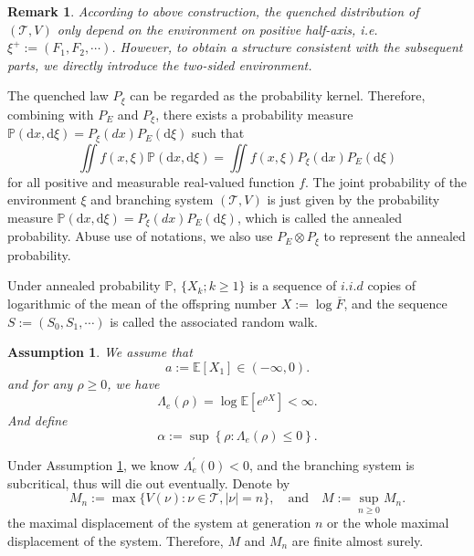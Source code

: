\documentclass[]{article}
\numberwithin{equation}{section}
\theoremstyle{thmstyleone}%
\theoremstyle{thmstyletwo}%
\newtheorem{remark}{Remark}%
\theoremstyle{thmstylethree}%
\theoremstyle{thmstylefour}%
\theoremstyle{thmstylefive}%
\newtheorem{assumption}{Assumption}
\theoremstyle{thmstylesix}%
\renewcommand{\d}{\mathrm{d}}
\newcommand{\E}{\mathbb{E}}
\newcommand{\T}{\mathcal{T}}
\renewcommand{\P}{\mathbb{P}}
\begin{document}
	\begin{remark}
		According to above construction, the quenched distribution of $\left(\T,V\right)$ only depend on the environment on positive half-axis, i.e. $\xi^+ :=\left(F_1,F_2,\cdots\right)$. However, to obtain a structure consistent with the subsequent parts, we directly introduce the two-sided environment.
	\end{remark}
	
	The quenched law $P_\xi$ can be regarded as the probability kernel. Therefore, combining with $P_E$ and $P_\xi$, 
	there exists a probability measure $\P(\d x, \d \xi)=P_\xi(dx) P_E(\d \xi)$ such that
	\begin{equation}\label{annealed prob}
	\iint f(x,\xi) \P(\d x, \d \xi) = \iint f(x,\xi) P_\xi(\d x)P_E(\d \xi)
	\end{equation}
	for all positive and measurable real-valued function $f$.
	The joint probability of the environment $\xi$ and branching system $(\mathcal{T},V)$ is just given by the probability measure $ \P(\d x, \d \xi)=P_\xi(dx) P_E(\d \xi)$, which is called the annealed probability. Abuse use of notations, we also use $P_E\otimes P_\xi$ to represent the annealed probability.
	
	
	Under annealed probability $\P$, $\{X_k;k\geqslant1\}$ is 
	a sequence of $i.i.d$ copies of logarithmic of the mean of the offspring number $X:=\log\overline{F} $,
	and the sequence $ S:=\left(S_0,S_1,\cdots\right) $ 
	is called the associated random walk.
	
	\begin{assumption}\label{subcritical}
		We assume that
		\begin{equation}
			a:=\E[X_1]\in (-\infty,0).
		\end{equation}
		and for any $\rho\geqslant0$, we have
		\begin{equation}
			\Lambda_e(\rho) = \log \E \left[ e^{\rho X} \right] <\infty.
		\end{equation}
	And define \begin{equation}\label{def of alpha}
	 \alpha:=\sup\left\{\rho:\Lambda_e(\rho)\leqslant 0\right\}.
	\end{equation}
	\end{assumption}
	
	Under Assumption \ref{subcritical}, we know $\Lambda_e^\prime(0)<0$, and the branching system is subcritical, thus will die out eventually. Denote by
	\begin{equation}
		M_n:= \max\{V(\nu):\nu\in \mathcal{T}, |\nu|=n\}, \quad \text{and}
		\quad M:= \sup\limits_{n\geqslant 0} M_n.
	\end{equation}
	the maximal displacement of the system at generation $n$ or the whole maximal displacement of the system. Therefore, $M$ and $M_n$ are finite almost surely.
	
\end{document}

